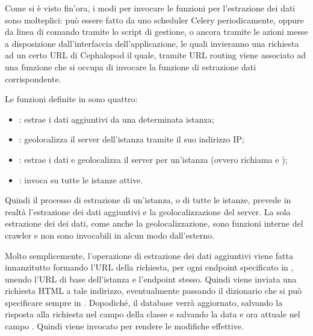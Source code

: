             Come si è visto fin'ora, i modi per invocare le funzioni per l'estrazione dei dati sono molteplici: può essere fatto da uno scheduler Celery periodicamente, oppure da linea di comando tramite lo script di gestione, o ancora tramite le azioni messe a disposizione dall'interfaccia dell'applicazione, le quali invieranno una richiesta ad un certo \ac{URL} di Cephalopod il quale, tramite \ac{URL} routing viene associato ad una funzione che si occupa di invocare la funzione di estrazione dati corrispondente.
            
            Le funzioni definite in  sono quattro:
            
            \begin{itemize}
                \item {}: estrae i dati aggiuntivi da una determinata istanza;
                \item {}: geolocalizza il server dell'istanza tramite il suo indirizzo \ac{IP};
                \item {}: estrae i dati e geolocalizza il server per un'istanza (ovvero richiama  e );
                \item {}: invoca  su tutte le istanze attive.
            \end{itemize}
            
            Quindi il processo di estrazione di un'istanza, o di tutte le istanze, prevede in realtà l'estrazione dei dati aggiuntivi e la geolocalizzazione del server. La sola estrazione dei dei dati, come anche la geolocalizzazione, sono funzioni interne del crawler e non sono invocabili in alcun modo dall'esterno.
            
            Molto semplicemente, l'operazione di estrazione dei dati aggiuntivi viene fatta innanzitutto formando l'\ac{URL} della richiesta, per ogni endpoint specificato in , unendo l'\ac{URL} di base dell'istanza e l'endpoint stesso. Quindi viene inviata una richiesta \ac{HTML} a tale indirizzo, eventualmente passando il dizionario  che si può specificare sempre in . Dopodiché, il database verrà aggiornato, salvando la risposta alla richiesta nel campo  della classe  e salvando la data e ora attuale nel campo . Quindi viene invocato  per rendere le modifiche effettive.
            
